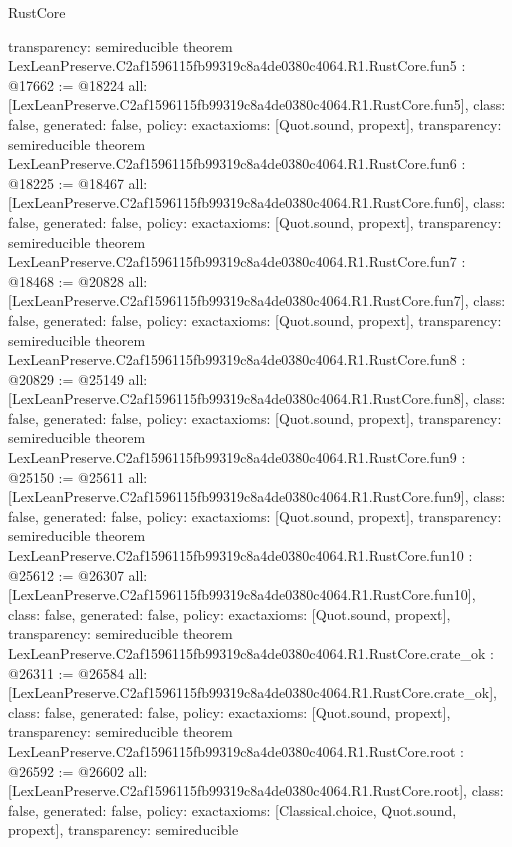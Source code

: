 \begin{lexlean}{RustCore}
\begin{coremodule}
{  transparency: semireducible
}
theorem LexLeanPreserve.C2af1596115fb99319c8a4de0380c4064.R1.RustCore.fun5 : @17662 := @18224 {
  all: [LexLeanPreserve.C2af1596115fb99319c8a4de0380c4064.R1.RustCore.fun5],
  class: false,
  generated: false,
  policy: exact{axioms: [Quot.sound, propext]},
  transparency: semireducible
}
theorem LexLeanPreserve.C2af1596115fb99319c8a4de0380c4064.R1.RustCore.fun6 : @18225 := @18467 {
  all: [LexLeanPreserve.C2af1596115fb99319c8a4de0380c4064.R1.RustCore.fun6],
  class: false,
  generated: false,
  policy: exact{axioms: [Quot.sound, propext]},
  transparency: semireducible
}
theorem LexLeanPreserve.C2af1596115fb99319c8a4de0380c4064.R1.RustCore.fun7 : @18468 := @20828 {
  all: [LexLeanPreserve.C2af1596115fb99319c8a4de0380c4064.R1.RustCore.fun7],
  class: false,
  generated: false,
  policy: exact{axioms: [Quot.sound, propext]},
  transparency: semireducible
}
theorem LexLeanPreserve.C2af1596115fb99319c8a4de0380c4064.R1.RustCore.fun8 : @20829 := @25149 {
  all: [LexLeanPreserve.C2af1596115fb99319c8a4de0380c4064.R1.RustCore.fun8],
  class: false,
  generated: false,
  policy: exact{axioms: [Quot.sound, propext]},
  transparency: semireducible
}
theorem LexLeanPreserve.C2af1596115fb99319c8a4de0380c4064.R1.RustCore.fun9 : @25150 := @25611 {
  all: [LexLeanPreserve.C2af1596115fb99319c8a4de0380c4064.R1.RustCore.fun9],
  class: false,
  generated: false,
  policy: exact{axioms: [Quot.sound, propext]},
  transparency: semireducible
}
theorem LexLeanPreserve.C2af1596115fb99319c8a4de0380c4064.R1.RustCore.fun10 : @25612 := @26307 {
  all: [LexLeanPreserve.C2af1596115fb99319c8a4de0380c4064.R1.RustCore.fun10],
  class: false,
  generated: false,
  policy: exact{axioms: [Quot.sound, propext]},
  transparency: semireducible
}
theorem LexLeanPreserve.C2af1596115fb99319c8a4de0380c4064.R1.RustCore.crate_ok : @26311 := @26584 {
  all: [LexLeanPreserve.C2af1596115fb99319c8a4de0380c4064.R1.RustCore.crate_ok],
  class: false,
  generated: false,
  policy: exact{axioms: [Quot.sound, propext]},
  transparency: semireducible
}
theorem LexLeanPreserve.C2af1596115fb99319c8a4de0380c4064.R1.RustCore.root : @26592 := @26602 {
  all: [LexLeanPreserve.C2af1596115fb99319c8a4de0380c4064.R1.RustCore.root],
  class: false,
  generated: false,
  policy: exact{axioms: [Classical.choice, Quot.sound, propext]},
  transparency: semireducible
}


\end{coremodule}
\end{lexlean}
